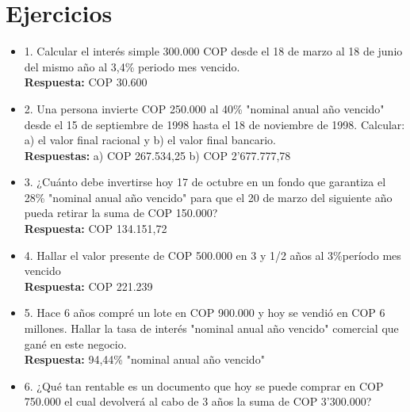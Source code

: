 

\chapter {Ejercicios}



\begin{itemize}
 \item 1. Calcular el interés simple 300.000 COP desde el 18 de marzo al 18 de junio del mismo año al 3,4\% periodo mes vencido.\\
       \textbf{Respuesta:} COP 30.600
       \medskip

 \item 2. Una persona invierte COP 250.000 al 40\% "nominal anual año vencido" desde el 15 de septiembre de 1998 hasta el 18 de noviembre de 1998. Calcular:
       \\
       a) el valor final racional y
       b) el valor final bancario.
       \\
       \textbf{Respuestas:} a) COP 267.534,25  b) COP 2'677.777,78
       \medskip

 \item 3. ¿Cuánto debe invertirse hoy 17 de octubre en un fondo que garantiza el 28\% "nominal anual año vencido" para que el 20 de marzo del siguiente año pueda retirar la suma de COP 150.000?\\
       \textbf{Respuesta:} COP 134.151,72
       \medskip


 \item 4. Hallar el valor presente de COP 500.000 en 3 y 1/2 años al 3\%período mes vencido\\
       \textbf{Respuesta:} COP 221.239
       \medskip

 \item 5. Hace 6 años compré un lote en COP 900.000 y hoy se vendió en COP 6 millones. Hallar la tasa de interés "nominal anual año vencido" comercial que gané en este negocio.\\
       \textbf{Respuesta: }94,44\% "nominal anual año vencido"
       \medskip

 \item 6. ¿Qué tan rentable es un documento que hoy se puede comprar en COP 750.000 el cual devolverá al cabo de 3 años la suma de COP 3'300.000?\\
       \medskip


\end{itemize}
